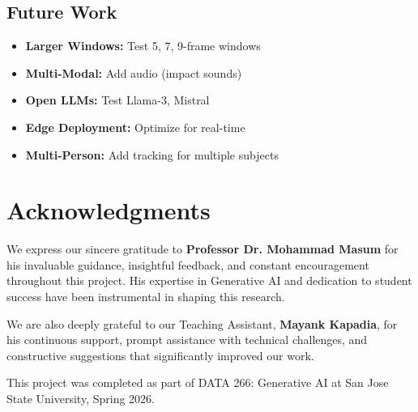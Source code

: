 \documentclass[conference]{IEEEtran}
\begin{document}
\subsection{Future Work}

\begin{itemize}[leftmargin=*]
    \item \textbf{Larger Windows:} Test 5, 7, 9-frame windows
    \item \textbf{Multi-Modal:} Add audio (impact sounds)
    \item \textbf{Open LLMs:} Test Llama-3, Mistral
    \item \textbf{Edge Deployment:} Optimize for real-time
    \item \textbf{Multi-Person:} Add tracking for multiple subjects
\end{itemize}

\section*{Acknowledgments}

We express our sincere gratitude to \textbf{Professor Dr. Mohammad Masum} for his invaluable guidance, insightful feedback, and constant encouragement throughout this project. His expertise in Generative AI and dedication to student success have been instrumental in shaping this research.

We are also deeply grateful to our Teaching Assistant, \textbf{Mayank Kapadia}, for his continuous support, prompt assistance with technical challenges, and constructive suggestions that significantly improved our work.

This project was completed as part of DATA 266: Generative AI at San Jose State University, Spring 2026.
\end{document}

